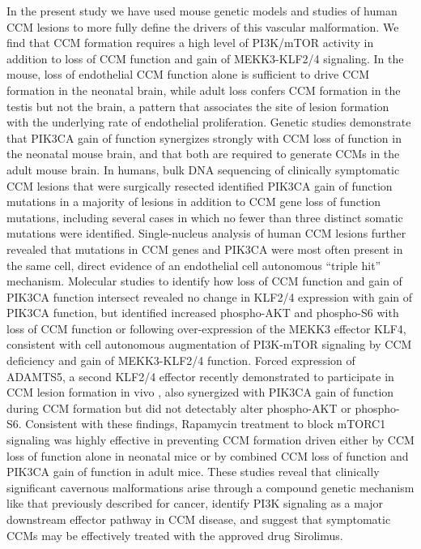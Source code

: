 In the present study we have used mouse genetic models and studies of human CCM lesions to more fully define the drivers of this vascular malformation. We find that CCM formation requires a high level of PI3K/mTOR activity in addition to loss of CCM function and gain of MEKK3-KLF2/4 signaling.  In the mouse, loss of endothelial CCM function alone is sufficient to drive CCM formation in the neonatal brain, while adult loss confers CCM formation in the testis but not the brain, a pattern that associates the site of lesion formation with the underlying rate of endothelial proliferation. Genetic studies demonstrate that PIK3CA gain of function synergizes strongly with CCM loss of function in the neonatal mouse brain, and that both are required to generate CCMs in the adult mouse brain. In humans, bulk DNA sequencing of clinically symptomatic CCM lesions that were surgically resected identified PIK3CA gain of function mutations in a majority of lesions in addition to CCM gene loss of function mutations, including several cases in which no fewer than three distinct somatic mutations were identified. Single-nucleus analysis of human CCM lesions further revealed that mutations in CCM genes and PIK3CA were most often present in the same cell, direct evidence of an endothelial cell autonomous “triple hit” mechanism. Molecular studies to identify how loss of CCM function and gain of PIK3CA function intersect revealed no change in KLF2/4 expression with gain of PIK3CA function, but identified increased phospho-AKT and phospho-S6 with loss of CCM function or following over-expression of the MEKK3 effector KLF4, consistent with cell autonomous augmentation of PI3K-mTOR signaling by CCM deficiency and gain of MEKK3-KLF2/4 function. Forced expression of ADAMTS5, a second KLF2/4 effector recently demonstrated to participate in CCM lesion formation in vivo \citep{hong2020}, also synergized with PIK3CA gain of function during CCM formation but did not detectably alter phospho-AKT or phospho-S6. Consistent with these findings, Rapamycin treatment to block mTORC1 signaling was highly effective in preventing CCM formation driven either by CCM loss of function alone in neonatal mice or by combined CCM loss of function and PIK3CA gain of function in adult mice. These studies reveal that clinically significant cavernous malformations arise through a compound genetic mechanism like that previously described for cancer, identify PI3K signaling as a major downstream effector pathway in CCM disease, and suggest that symptomatic CCMs may be effectively treated with the approved drug Sirolimus. 


